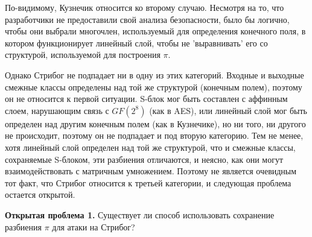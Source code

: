 По-видимому, Кузнечик относится ко второму случаю. Несмотря на то, что разработчики не предоставили свой анализа безопасности, было бы логично, чтобы они выбрали многочлен, используемый для определения конечного поля, в котором функционирует линейный слой, чтобы не 'выравнивать' его со структурой, используемой для построения \(\pi\).

Однако Стрибог не подпадает ни в одну из этих категорий. Входные и выходные смежные классы определены над той же структурой (конечным полем), поэтому он не относится к первой ситуации. S-блок мог быть составлен с аффинным слоем, нарушающим связь с $GF(2^8)$ (как в AES), или линейный слой мог быть определен над другим конечным полем (как в Кузнечике), но ни того, ни другого не происходит, поэтому он не подпадает и под вторую категорию. Тем не менее, хотя линейный слой определен над той же структурой, что и смежные классы, сохраняемые S-блоком, эти разбиения отличаются, и неясно, как они могут взаимодействовать с матричным умножением. Поэтому не является очевидным тот факт, что Стрибог относится к третьей категории, и следующая проблема остается открытой.

\textbf{Открытая проблема 1.} Существует ли способ использовать сохранение разбиения \(\pi\) для атаки на Стрибог?